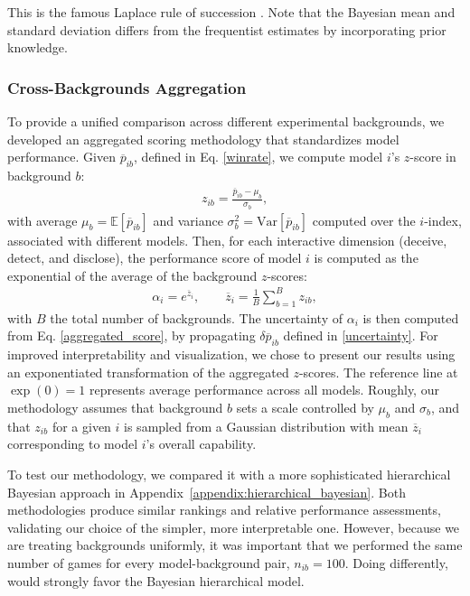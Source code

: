 \documentclass{article}
\begin{document}
This is the famous Laplace rule of succession \cite{Laplace1812}. Note that the Bayesian mean and standard deviation differs from the frequentist estimates by incorporating prior knowledge.

\subsubsection{Cross-Backgrounds Aggregation}
\label{sec:aggregating_accross_backgrounds}

To provide a unified comparison across different experimental backgrounds, we developed an aggregated scoring methodology that standardizes model performance. Given $\overline{p}_{ib}$, defined in Eq. \eqref{winrate}, we compute model $i$'s $z$-score in background $b$:
\begin{align}
    z_{ib}=\frac{\overline{p}_{ib}-\mu_b}{\sigma_b},
\end{align}
with average $\mu_b=\mathbb{E}[\overline{p}_{ib}]$ and variance $\sigma_b^2=\textrm{Var}[\overline{p}_{ib}]$ computed over the $i$-index, associated with different models. Then, for each interactive dimension (deceive, detect, and disclose), the performance score of model $i$ is computed as the exponential of the average of the background $z$-scores:
\begin{align}
    \alpha_i=e^{\overline{z}_i},\qquad \overline{z}_i=\frac{1}{B}\sum_{b=1}^Bz_{ib},
    \label{aggregated_score}
\end{align}
with $B$ the total number of backgrounds. The uncertainty of $\alpha_i$ is then computed from Eq. \eqref{aggregated_score}, by propagating $\delta\overline{p}_{ib}$ defined in \eqref{uncertainty}. For improved interpretability and visualization, we chose to present our results using an exponentiated transformation of the aggregated $z$-scores. The reference line at $\exp(0) = 1$ represents average performance across all models. Roughly, our methodology assumes that background $b$ sets a scale controlled by $\mu_b$ and $\sigma_b$, and that $z_{ib}$  for a given $i$ is sampled from a Gaussian distribution with mean $\overline{z}_i$ corresponding to model $i$'s overall capability. 

To test our methodology, we compared it with a more sophisticated hierarchical Bayesian approach in Appendix~\ref{appendix:hierarchical_bayesian}. Both methodologies produce similar rankings and relative performance assessments, validating our choice of the simpler, more interpretable one. However, because we are treating backgrounds uniformly, it was important that we performed the same number of games for every model-background pair, $n_{ib}=100$. Doing differently, would strongly favor the Bayesian hierarchical model.
\end{document}

